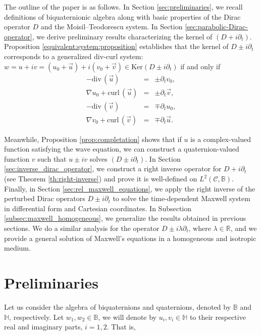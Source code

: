\documentclass[12pt]{article}
\def\div{\mbox{div}\,}
\def\curl{\mbox{curl}\,}
\def\B{\mathbb{B}}
\begin{document}
The outline of the paper is as follows. In Section \ref{sec:preliminaries}, we recall definitions of biquaternionic algebra along with basic properties of the Dirac operator $D$ and the Moisil--Teodorescu system. In Section \ref{sec:parabolic-Dirac-operator}, we derive preliminary results characterizing the kernel of $(D+i\partial_t)$. Proposition \ref{equivalent:system:proposition} establishes that the kernel of $D\pm i\partial_t$ corresponds to a generalized div-curl system: $w=u+iv=(u_0+\vec{u})+i(v_0+\vec{v})\in \text{Ker}(D\pm i\partial_t)$ if and only if
\begin{equation*}
    \begin{array}{rcl}
        -\div(\vec{u})&=&\pm \partial_t v_0,\\
        \nabla u_0+\curl(\vec{u})&=& \pm\partial_t \vec{v},\\
        -\div(\vec{v})&=&\mp\partial_t u_0,\\
        \nabla v_0+\curl(\vec{v})&=&\mp\partial_t \vec{u}.
    \end{array}
\end{equation*}

Meanwhile, Proposition \ref{prop:completation} shows that if $u$ is a complex-valued function satisfying the wave equation, we can construct a quaternion-valued function $v$ such that $u\pm iv$ solves $(D\pm i\partial_t)$. In Section \ref{sec:inverse_dirac_operator}, we construct a right inverse operator for $D+i\partial_t$ (see Theorem \ref{th:right-inverse}) and prove it is well-defined on $L^2(\mathscr{C},\mathbb{B})$. Finally, in Section \ref{sec:rel_maxwell_equations}, we apply the right inverse of the perturbed Dirac operators $D\pm i\partial_t$ to solve the time-dependent Maxwell system in differential form and Cartesian coordinates. In Subsection \ref{subsec:maxwell_homogeneous}, we generalize the results obtained in previous sections. We do a similar analysis for the operator $D\pm i\lambda \partial_t$, where $\lambda\in \mathbb{R}$, and we provide a general solution of Maxwell's equations in a homogeneous and isotropic medium.

\section{Preliminaries}\label{subsec:Preliminaries}\label{sec:preliminaries}
Let us consider the algebra of biquaternions and quaternions, denoted by $\B$ and $\mathbb{H}$, respectively. Let $w_1,w_2\in\B$, we will denote by $u_i, v_i\in \mathbb{H}$ to their respective real and imaginary parts, $i=1,2$. That is,
\end{document}
